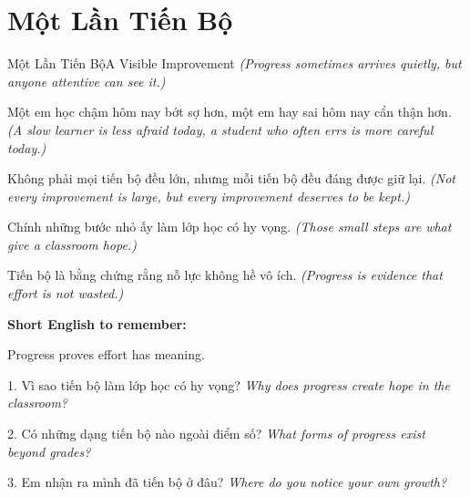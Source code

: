 \section{Một Lần Tiến Bộ}
\begin{truyen}{Một Lần Tiến Bộ}{A Visible Improvement}
\textit{(Progress sometimes arrives quietly, but anyone attentive can see it.)}

Một em học chậm hôm nay bớt sợ hơn, một em hay sai hôm nay cẩn thận hơn.
\textit{(A slow learner is less afraid today, a student who often errs is more careful today.)}

Không phải mọi tiến bộ đều lớn, nhưng mỗi tiến bộ đều đáng được giữ lại.
\textit{(Not every improvement is large, but every improvement deserves to be kept.)}

Chính những bước nhỏ ấy làm lớp học có hy vọng.
\textit{(Those small steps are what give a classroom hope.)}
\end{truyen}

\begin{baihoc}
Tiến bộ là bằng chứng rằng nỗ lực không hề vô ích.
\textit{(Progress is evidence that effort is not wasted.)}
\end{baihoc}

\begin{ghinhoanh}
\textbf{Short English to remember:}

Progress proves effort has meaning.

\end{ghinhoanh}

\begin{tuhocnhanh}
1. Vì sao tiến bộ làm lớp học có hy vọng? \textit{Why does progress create hope in the classroom?}

2. Có những dạng tiến bộ nào ngoài điểm số? \textit{What forms of progress exist beyond grades?}

3. Em nhận ra mình đã tiến bộ ở đâu? \textit{Where do you notice your own growth?}
\end{tuhocnhanh}
\ngancach